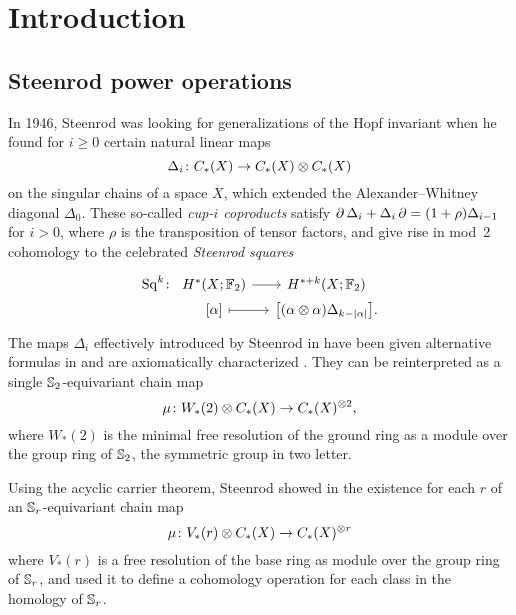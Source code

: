 
\section{Introduction}\label{s:introduction}

\subsection{Steenrod power operations}

In 1946, Steenrod was looking for generalizations of the Hopf invariant when he found for $i \geq 0$ certain natural linear maps
\[
\Delta_i \colon C_{*}(X) \to C_{*}(X) \otimes C_{*}(X)
\]
on the singular chains of a space $X$, which extended the Alexander--Whitney diagonal $\Delta_0$.
These so-called \textit{cup-$i$ coproducts} satisfy $\operatorname{\partial}\Delta_i + \Delta_i\operatorname{\partial} = (1+\rho)\Delta_{i-1}$ for $i > 0$, where $\rho$ is the transposition of tensor factors, and give rise in mod~2 cohomology to the celebrated \emph{Steenrod squares}
\begin{equation}\label{eq:intro Sq}
	\begin{tikzcd}[column sep=small, row sep=0]
		\Sq^{k} \colon &[-15pt] H^*(X;\mathbb{F}_2) \arrow[r] & H^{*+k}(X;\mathbb{F}_2) \\
		& {[\alpha]} \arrow[r, mapsto] & {\big[(\alpha \otimes \alpha)\Delta_{k-\bars{\alpha}}\big]}.
	\end{tikzcd}
\end{equation}
The maps $\Delta_i$ effectively introduced by Steenrod in \cite{steenrod1947products} have been given alternative formulas in \cite{real1996computability,medina2021fast_sq} and are axiomatically characterized \cite{medina2022axiomatic}.
They can be reinterpreted as a single $\mathbb{S}_2$-equivariant chain map
\[
\mu \colon W_*(2) \otimes C_{*}(X) \to C_{*}(X)^{\otimes 2},
\]
where $W_*(2)$ is the minimal free resolution of the ground ring as a module over the group ring of $\mathbb{S}_2$, the symmetric group in two letter.

Using the acyclic carrier theorem, Steenrod showed in \cite{steenrod1952reduced} the existence for each $r$ of an $\mathbb{S}_r$-equivariant chain map
\[
\mu \colon V_\ast(r) \otimes C_{*}(X) \to C_{*}(X)^{\otimes r}
\]
where $V_\ast(r)$ is a free resolution of the base ring as module over the group ring of $\mathbb{S}_r$, and used it to define a cohomology operation for each class in the homology of $\mathbb{S}_r$.

